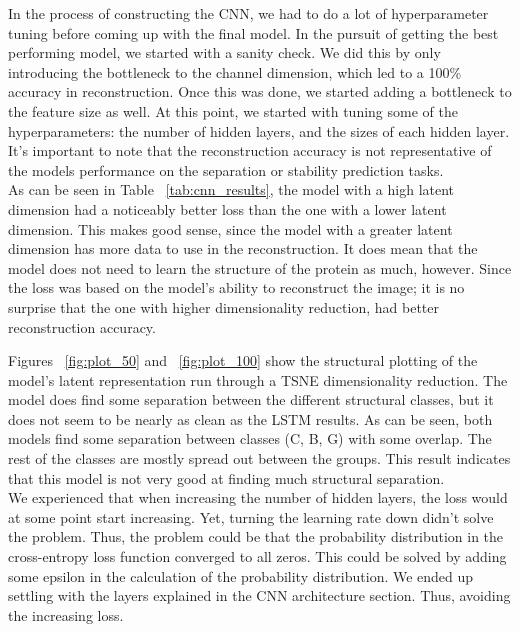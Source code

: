 In the process of constructing the CNN, we had to do a lot of hyperparameter tuning before coming up with the final model. In the pursuit of getting the best performing model, we started with a sanity check. We did this by only introducing the bottleneck to the channel dimension, which led to a 100\% accuracy in reconstruction. Once this was done, we started adding a bottleneck to the feature size as well. At this point, we started with tuning some of the hyperparameters: the number of hidden layers, and the sizes of each hidden layer. \\

\noindent
It's important to note that the reconstruction accuracy is not representative of the models performance on the separation or stability prediction tasks.\\

\noindent
As can be seen in Table ~\ref{tab:cnn_results}, the model with a high latent dimension had a noticeably better loss than the one with a lower latent dimension. This makes good sense, since the model with a greater latent dimension has more data to use in the reconstruction. It does mean that the model does not need to learn the structure of the protein as much, however. Since the loss was based on the model's ability to reconstruct the image; it is no surprise that the one with higher dimensionality reduction, had better reconstruction accuracy.

\noindent
Figures ~\ref{fig:plot_50} and ~\ref{fig:plot_100} show the structural plotting of the model's latent representation run through a TSNE dimensionality reduction. The model does find some separation between the different structural classes, but it does not seem to be nearly as clean as the LSTM results. As can be seen, both models find some separation between classes (C, B, G) with some overlap. The rest of the classes are mostly spread out between the groups. This result indicates that this model is not very good at finding much structural separation. \\

\noindent
We experienced that when increasing the number of hidden layers, the loss would at some point start increasing. Yet, turning the learning rate down didn't solve the problem. Thus, the problem could be that the probability distribution in the cross-entropy loss function converged to all zeros. This could be solved by adding some epsilon in the calculation of the probability distribution. We ended up settling with the layers explained in the CNN architecture section. Thus, avoiding the increasing loss. \\

